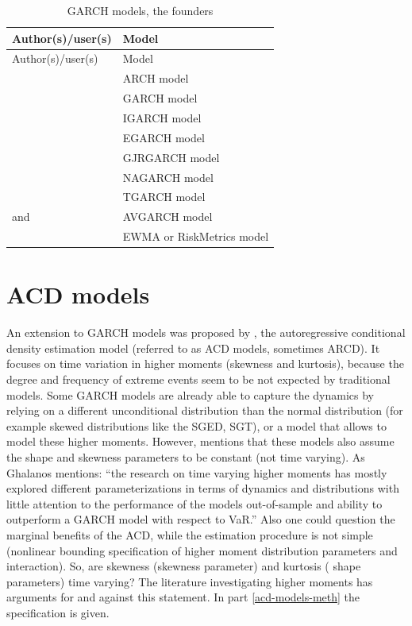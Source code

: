 \documentclass[a4paper, nobind]{templates/ociamthesis}
\begin{document}
\newpage

\begin{longtable}[]{@{}ll@{}}
\caption{GARCH models, the founders}\tabularnewline
\toprule
Author(s)/user(s) & Model\tabularnewline
\midrule
\endfirsthead
\toprule
Author(s)/user(s) & Model\tabularnewline
\midrule
\endhead
\textcite{engle1982} & ARCH model\tabularnewline
\textcite{bollerslev1986} & GARCH model\tabularnewline
\textcite{bollerslev1986} & IGARCH model\tabularnewline
\textcite{nelson1991} & EGARCH model\tabularnewline
\textcite{glosten1993} & GJRGARCH model\tabularnewline
\textcite{engle1993} & NAGARCH model\tabularnewline
\textcite{zakoian1994} & TGARCH model\tabularnewline
\textcite{taylor1986} and \textcite{schwert1989} & AVGARCH model\tabularnewline
\textcite{morganguarantytrustcompany1996} & EWMA or RiskMetrics model\tabularnewline
\bottomrule
\end{longtable}

\hypertarget{acd-models}{%
\section{ACD models}\label{acd-models}}

An extension to GARCH models was proposed by \textcite{hansen1994}, the autoregressive conditional density estimation model (referred to as ACD models, sometimes ARCD). It focuses on time variation in higher moments (skewness and kurtosis), because the degree and frequency of extreme events seem to be not expected by traditional models. Some GARCH models are already able to capture the dynamics by relying on a different unconditional distribution than the normal distribution (for example skewed distributions like the SGED, SGT), or a model that allows to model these higher moments. However, \textcite{ghalanos2016} mentions that these models also assume the shape and skewness parameters to be constant (not time varying). As Ghalanos mentions: ``the research on time varying higher moments has mostly explored different parameterizations in terms of dynamics and distributions with little attention to the performance of the models out-of-sample and ability to outperform a GARCH model with respect to VaR.'' Also one could question the marginal benefits of the ACD, while the estimation procedure is not simple (nonlinear bounding specification of higher moment distribution parameters and interaction). So, are skewness (skewness parameter) and kurtosis ( shape parameters) time varying? The literature investigating higher moments has arguments for and against this statement. In part \ref{acd-models-meth} the specification is given.
\end{document}
